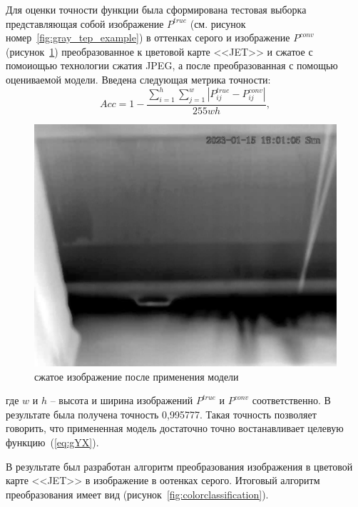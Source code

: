 \documentclass[14pt, a4paper]{extreport}
\begin{document}
	Для оценки точности функции была сформирована тестовая выборка представляющая собой изображение $P^{true}$ (см. рисунок номер~\ref{fig:gray_tep_example}) в оттенках серого и изображение $P^{conv}$ (рисунок~\ref{fig:grey2}) преобразованное к цветовой карте <<JET>> и сжатое с помоиощью технологии сжатия JPEG, а после преобразованная с помощью оцениваемой модели. Введена следующая метрика точности:
	\begin{equation}
		Acc = 1 - \frac{\sum\limits_{i=1}^h \sum\limits_{j=1}^w |P^{true}_{ij} - P^{conv}_{ij}|}{255wh},
		\label{eq:flanaccuracy}
	\end{equation}
	\begin{figure}[h!]
		\centering
		\includegraphics[width = 13cm]{image/chapter_2/grey2}	
		\caption{сжатое изображение после применения модели}
		\label{fig:grey2}
	\end{figure}
	где $w$ и $h$ -- высота и ширина изображений $P^{true}$ и $P^{conv}$ соответственно. В результате была получена точность 0,995777. Такая точность позволяет \\ говорить, что примененная модель достаточно точно востанавливает целевую функцию~(\ref{eq:gYX}).

	В результате был разработан алгоритм преобразования изображения в цветовой карте <<JET>> в изображение в оотенках серого. Итоговый алгоритм преобразования имеет вид (рисунок~\ref{fig:colorclassification}).
	
\end{document}
